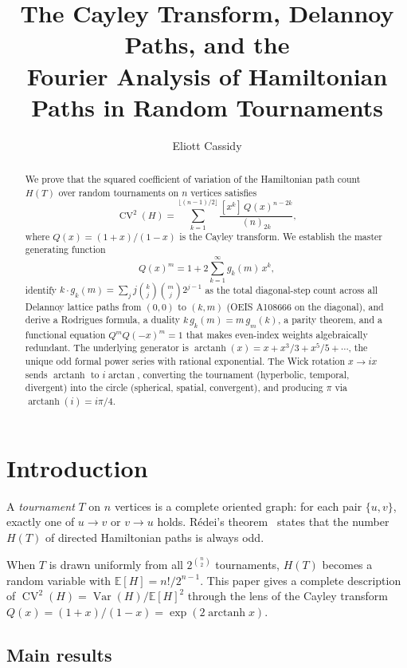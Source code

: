 \documentclass[11pt]{amsart}
\title{The Cayley Transform, Delannoy Paths, and the\\Fourier Analysis of Hamiltonian Paths in Random Tournaments}
\author{Eliott Cassidy}
\theoremstyle{definition}
\DeclareMathOperator{\CV}{CV}
\DeclareMathOperator{\Var}{Var}
\DeclareMathOperator{\arctanh}{arctanh}
\DeclareMathOperator{\arctan}{arctan}
\begin{document}
\begin{abstract}
We prove that the squared coefficient of variation of the Hamiltonian path count $H(T)$ over random tournaments on $n$ vertices satisfies
\[
\CV^2(H) = \sum_{k=1}^{\lfloor(n-1)/2\rfloor} \frac{[x^k]\, Q(x)^{n-2k}}{(n)_{2k}},
\]
where $Q(x) = (1+x)/(1-x)$ is the Cayley transform. We establish the master generating function
\[
Q(x)^m = 1 + 2\sum_{k=1}^{\infty} g_k(m)\, x^k,
\]
identify $k\cdot g_k(m) = \sum_j j\binom{k}{j}\binom{m}{j}2^{j-1}$ as the total diagonal-step count across all Delannoy lattice paths from $(0,0)$ to $(k,m)$ (OEIS A108666 on the diagonal), and derive a Rodrigues formula, a duality $k\,g_k(m) = m\,g_m(k)$, a parity theorem, and a functional equation $Q^m Q(-x)^m = 1$ that makes even-index weights algebraically redundant. The underlying generator is $\arctanh(x) = x + x^3/3 + x^5/5 + \cdots$, the unique odd formal power series with rational exponential. The Wick rotation $x \to ix$ sends $\arctanh$ to $i\arctan$, converting the tournament (hyperbolic, temporal, divergent) into the circle (spherical, spatial, convergent), and producing $\pi$ via $\arctanh(i) = i\pi/4$.
\end{abstract}

\maketitle

\section{Introduction}

A \emph{tournament} $T$ on $n$ vertices is a complete oriented graph: for each pair $\{u,v\}$, exactly one of $u \to v$ or $v \to u$ holds. R\'edei's theorem~\cite{redei1934} states that the number $H(T)$ of directed Hamiltonian paths is always odd.

When $T$ is drawn uniformly from all $2^{\binom{n}{2}}$ tournaments, $H(T)$ becomes a random variable with $\mathbb{E}[H] = n!/2^{n-1}$. This paper gives a complete description of $\CV^2(H) = \Var(H)/\mathbb{E}[H]^2$ through the lens of the Cayley transform $Q(x) = (1+x)/(1-x) = \exp(2\arctanh x)$.

\subsection{Main results}
\end{document}
